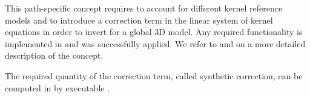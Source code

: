 This path-specific concept requires to account for different kernel reference models and to introduce a
correction term in the linear system of kernel equations in order to invert for a global 3D model. Any 
required functionality is implemented in \ASKI{} and was successfully applied. We refer to \cite{Lamara.2015b}
and \cite{Schumacher16} on a more detailed description of the concept.

The required quantity of the correction term, called synthetic correction, can be computed in \ASKI{} by 
executable  .
